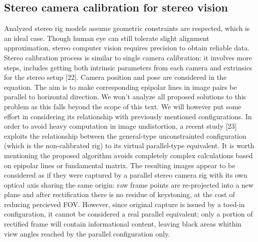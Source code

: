 \subsection{Stereo camera calibration for stereo vision}
Analyzed stereo rig models assume geometric constraints are respected, which is an ideal case. Though human eye can still tolerate slight alignment approximation, stereo computer vision requires precision to obtain reliable data. Stereo calibration process is similar to single camera calibration: it involves more steps, includes getting both intrinsic parameters from each camera and extrinsics for the stereo setup [22]. Camera position and pose are considered in the equation. The aim is to make corresponding epipolar lines in image pairs be parallel to horizontal direction. We won't analyze all proposed solutions to this problem as this falls beyond the scope of this text. We will however put some effort in considering its relationship with previously mentioned configurations. In order to avoid heavy computation in image undistortion, a recent study [23] exploits the relationship between the general-type unconstrainted configuration (which is the non-calibrated rig) to its virtual parallel-type equivalent. It is worth mentioning the proposed algorithm avoids completely complex calculations based on epipolar lines or fundamental matrix. The resulting images appear to be considered as if they were captured by a parallel stereo camera rig with its own optical axis sharing the same origin: raw frame points are re-projected into a new plane and after rectification there is no residue of keystoning, at the cost of reducing percieved FOV. However, since original capture is issued by a toed-in configuration, it cannot be considered a real parallel equivalent; only a portion of rectified frame will contain informational content, leaving black areas whithin view angles reached by the parallel configuration only.

